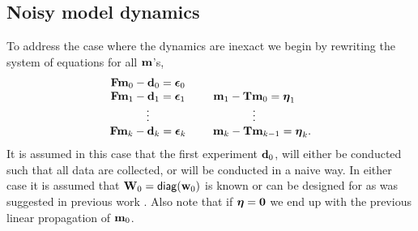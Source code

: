 \documentclass[11pt]{article}
\begin{document}


\subsection{Noisy model dynamics}
\label{sec:Noisy}

To address the case where the dynamics are inexact we begin by  
rewriting the system of equations for all  ${\bf{m}}$'s,
\begin{align*}
\label{eq:noisy}
\begin{array}{cc}
{\bf{F}}{\bf{m}}_{0} - {\bf{d}}_0 = {\boldsymbol \epsilon}_0 & \\
{\bf{F}}{\bf{m}}_{1} - {\bf{d}}_1 = {\boldsymbol \epsilon}_1 & {\bf{m}}_1 -{\bf{T}}{\bf{m}}_0 = {\boldsymbol \eta}_1 \\
\vdots & \vdots \\
{\bf{F}}{\bf{m}}_{k} - {\bf{d}}_k = {\boldsymbol \epsilon}_k &  \;\;\;\;\;{\bf{m}}_k -{\bf{T}}{\bf{m}}_{k-1} = {\boldsymbol \eta}_k.
\end{array}
\end{align*} 
It is  assumed in this case that the first experiment ${\bf{d}}_0$, will either be conducted such that all data are collected,  or will be conducted in a naive way.  In either case it is assumed that ${\bf{W}}_0 = {\sf diag}({\bf{w}}_0)$ is known
or can be designed for as was suggested in previous work \cite{Haber2011}.
Also note that if ${\boldsymbol \eta} = {\bf 0}$ we end up with the previous linear propagation of ${\bf{m}}_{0}$. 
\end{document}
